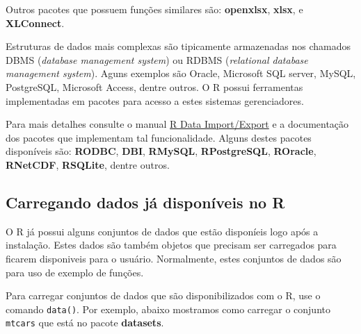 \documentclass[10pt,a4paper]{book}
\begin{document}
Outros pacotes que possuem funções similares são: \textbf{openxlsx},
\textbf{xlsx}, e \textbf{XLConnect}.

Estruturas de dados mais complexas são tipicamente armazenadas nos
chamados DBMS (\emph{database management system}) ou RDBMS
(\emph{relational database management system}). Aguns exemplos são
Oracle, Microsoft SQL server, MySQL, PostgreSQL, Microsoft Access,
dentre outros. O R possui ferramentas implementadas em pacotes para
acesso a estes sistemas gerenciadores.

Para mais detalhes consulte o manual
\href{http://cran-r.c3sl.ufpr.br/doc/manuals/r-release/R-data.html}{R
Data Import/Export} e a documentação dos pacotes que implementam tal
funcionalidade. Alguns destes pacotes disponíveis são: \textbf{RODBC},
\textbf{DBI}, \textbf{RMySQL}, \textbf{RPostgreSQL}, \textbf{ROracle},
\textbf{RNetCDF}, \textbf{RSQLite}, dentre outros.

\subsection{Carregando dados já disponíveis no
R}\label{carregando-dados-ja-disponiveis-no-r}

O R já possui alguns conjuntos de dados que estão disponíeis logo após a
instalação. Estes dados são também objetos que precisam ser carregados
para ficarem disponiveis para o usuário. Normalmente, estes conjuntos de
dados são para uso de exemplo de funções.

Para carregar conjuntos de dados que são disponibilizados com o R, use o
comando \texttt{data()}. Por exemplo, abaixo mostramos como carregar o
conjunto \texttt{mtcars} que está no pacote \textbf{datasets}.
\end{document}
